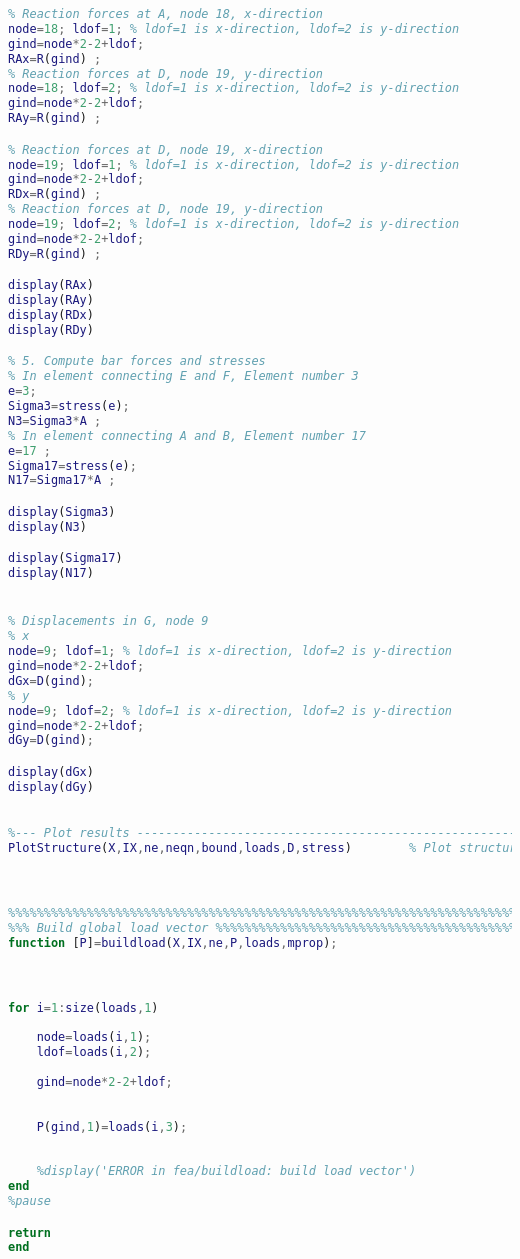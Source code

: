 \begin{lstlisting}[language=Matlab, caption = FE implementation for Linear truss analysis, label=lst:CodeLinear]
% 4. Compute reaction forces and compare with analytical
% Reaction forces at A, node 18, x-direction
node=18; ldof=1; % ldof=1 is x-direction, ldof=2 is y-direction
gind=node*2-2+ldof;
RAx=R(gind) ;
% Reaction forces at D, node 19, y-direction
node=18; ldof=2; % ldof=1 is x-direction, ldof=2 is y-direction
gind=node*2-2+ldof;
RAy=R(gind) ;

% Reaction forces at D, node 19, x-direction
node=19; ldof=1; % ldof=1 is x-direction, ldof=2 is y-direction
gind=node*2-2+ldof;
RDx=R(gind) ;
% Reaction forces at D, node 19, y-direction
node=19; ldof=2; % ldof=1 is x-direction, ldof=2 is y-direction
gind=node*2-2+ldof;
RDy=R(gind) ;

display(RAx)
display(RAy)
display(RDx)
display(RDy)

% 5. Compute bar forces and stresses
% In element connecting E and F, Element number 3
e=3;
Sigma3=stress(e);
N3=Sigma3*A ;
% In element connecting A and B, Element number 17
e=17 ;
Sigma17=stress(e);
N17=Sigma17*A ;

display(Sigma3)
display(N3)

display(Sigma17)
display(N17)


% Displacements in G, node 9
% x
node=9; ldof=1; % ldof=1 is x-direction, ldof=2 is y-direction
gind=node*2-2+ldof;
dGx=D(gind);
% y
node=9; ldof=2; % ldof=1 is x-direction, ldof=2 is y-direction
gind=node*2-2+ldof;
dGy=D(gind);

display(dGx)
display(dGy)

                                                        
%--- Plot results --------------------------------------------------------%                                                        
PlotStructure(X,IX,ne,neqn,bound,loads,D,stress)        % Plot structure



%%%%%%%%%%%%%%%%%%%%%%%%%%%%%%%%%%%%%%%%%%%%%%%%%%%%%%%%%%%%%%%%%%%%%%%%%%%
%%% Build global load vector %%%%%%%%%%%%%%%%%%%%%%%%%%%%%%%%%%%%%%%%%%%%%%
function [P]=buildload(X,IX,ne,P,loads,mprop);



for i=1:size(loads,1)
    
    node=loads(i,1);
    ldof=loads(i,2);
    
    gind=node*2-2+ldof;
    
   
    P(gind,1)=loads(i,3);
    
    
    %display('ERROR in fea/buildload: build load vector')
end
%pause

return
end


\end{lstlisting}
